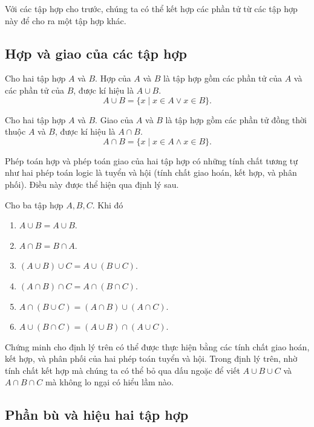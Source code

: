 Với các tập hợp cho trước, chúng ta có thể kết hợp các phần tử từ các tập hợp này để cho ra một tập hợp khác.

\subsection*{Hợp và giao của các tập hợp}

\begin{definition}
    Cho hai tập hợp $A$ và $B$. Hợp của $A$ và $B$ là tập hợp gồm các phần tử của $A$ và các phần tử của $B$, được kí hiệu là $A\cup B$.
    \[
        A\cup B = \{ x \mid x\in A \vee x\in B \}.
    \]
\end{definition}

\begin{definition}
    Cho hai tập hợp $A$ và $B$. Giao của $A$ và $B$ là tập hợp gồm các phần tử đồng thời thuộc $A$ và $B$, được kí hiệu là $A\cap B$.
    \[
        A\cap B = \{ x \mid x\in A \wedge x\in B \}.
    \]
\end{definition}

Phép toán hợp và phép toán giao của hai tập hợp có những tính chất tương tự như hai phép toán logic là tuyển và hội (tính chất giao hoán, kết hợp, và phân phối). Điều này được thể hiện qua định lý sau.

\begin{theorem}
    Cho ba tập hợp $A, B, C$. Khi đó
    \begin{enumerate}[label={(\roman*)}]
        \item $A\cup B = A\cup B$.
        \item $A\cap B = B\cap A$.
        \item $(A\cup B)\cup C = A\cup (B\cup C)$.
        \item $(A\cap B)\cap C = A\cap (B\cap C)$.
        \item $A\cap (B\cup C) = (A\cap B) \cup (A\cap C)$.
        \item $A\cup (B\cap C) = (A\cup B) \cap (A\cup C)$.
    \end{enumerate}
\end{theorem}

Chứng minh cho định lý trên có thể được thực hiện bằng các tính chất giao hoán, kết hợp, và phân phối của hai phép toán tuyển và hội. Trong định lý trên, nhờ tính chất kết hợp mà chúng ta có thể bỏ qua dấu ngoặc để viết $A\cup B\cup C$ và $A\cap B\cap C$ mà không lo ngại có hiểu lầm nào.

\subsection*{Phần bù và hiệu hai tập hợp}

